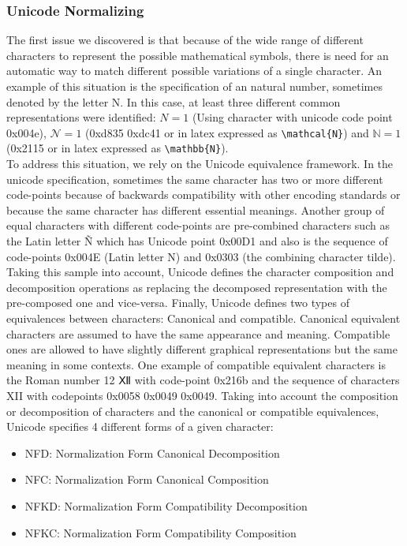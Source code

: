 \subsubsection{Unicode Normalizing} 
The first issue we discovered is that because of the wide range of different characters to represent the possible mathematical symbols, there is need for an automatic way to match different possible variations of a single character. An example of this situation is the specification of an natural number, sometimes denoted by the letter N. In this case, at least three different common representations were identified: $ N = 1 $ (Using character with unicode code point 0x004e), $\mathcal{N} = 1$ (0xd835 0xdc41 or in latex expressed as \lstinline|\mathcal{N}|) and $\mathbb{N} = 1$ (0x2115 or in latex expressed as \lstinline|\mathbb{N}|). \\
  To address this situation, we rely on the Unicode equivalence framework. In the unicode specification, sometimes the same character has two or more different code-points because of backwards compatibility with other encoding standards or because the same character has different essential meanings. Another group of equal characters with different code-points are pre-combined characters such as the Latin letter \~{N} which has Unicode point 0x00D1 and also is the sequence of code-points 0x004E (Latin letter N) and 0x0303 (the combining character tilde). Taking this sample into account, Unicode defines the character composition and decomposition operations as replacing the decomposed representation with the pre-composed one and vice-versa. Finally, Unicode defines two types of equivalences between characters: Canonical and compatible. Canonical equivalent characters are assumed to have the same appearance and meaning. Compatible ones are allowed to have slightly different graphical representations but the same meaning in some contexts. One example of compatible equivalent characters is the Roman number 12 {\unicodefontⅫ} with code-point 0x216b and the sequence of characters XII with codepoints 0x0058 0x0049 0x0049. Taking into account the composition or decomposition of characters and the canonical or compatible equivalences, Unicode specifies 4 different forms of a given character:
  \begin{itemize}
  \item NFD: Normalization Form Canonical Decomposition
  \item NFC: Normalization Form Canonical Composition
  \item NFKD: Normalization Form Compatibility Decomposition
  \item NFKC: Normalization Form Compatibility Composition
  \end{itemize}
  
